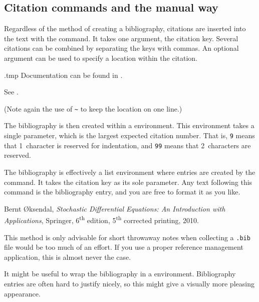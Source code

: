 %
\subsection{Citation commands and the manual way}

Regardless of the method of creating a bibliography,
citations are inserted into the text with the  command.
It takes one argument, the citation key.
Several citations can be combined by separating the keys with commas.
An optional argument can be used to specify a location within the citation.

\begin{VerbatimOut}{\jobname.tmp}
Documentation can be found in
\cite{TLC, tikz}.

See \cite[Chapter~8]{TLC}.
\end{VerbatimOut}
\ShowExample
(Note again the use of \verb|~| to keep the location on one line.)

The bibliography is then created within a  environment.
This environment takes a single parameter,
which is the largest expected citation number.
That is, \verb|9| means that 1~character is reserved for indentation,
and \verb|99| means that 2~characters are reserved.

The bibliography is effectively a list environment
where entries are created by the  command.
It takes the citation key as its sole parameter.
Any text following this command is the bibliography entry,
and you are free to format it as you like.

\begin{ExampleCode}
\begin{thebibliography}{9}

    Bernt \O{}ksendal,
    \textit{Stochastic Differential Equations:
    An Introduction with Applications},
    Springer,
    6\textsuperscript{th} edition, 5\textsuperscript{th} corrected printing,
    2010.

\end{thebibliography}
\end{ExampleCode}

\begin{practices}
This method is only advisable for short throwaway notes
when collecting a \verb|.bib| file would be too much of an effort.
If you use a proper reference management application,
this is almost never the case.
\end{practices}

\begin{technote}
It might be useful to wrap the bibliography in a  environment.
Bibliography entries are often hard to justify nicely,
so this might give a visually more pleasing appearance.
\end{technote}



